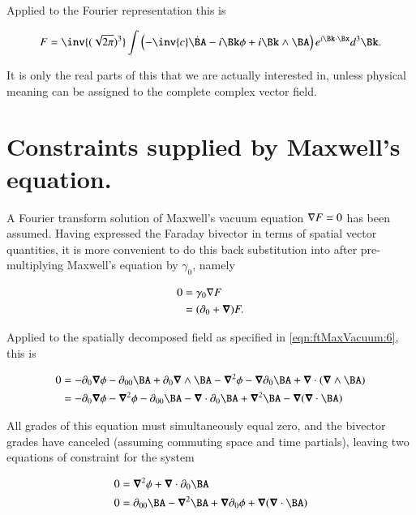 Applied to the Fourier representation this is

\begin{align}
\label{eqn:ftMaxVacuum:7}
F =
\inv{(\sqrt{2 \pi})^3} \int
\left(
- \inv{c} \dot{\BA}
- i \Bk \phi
+ i \Bk \wedge \BA
\right)
e^{i \Bk \cdot \Bx } d^3 \Bk.
\end{align}

It is only the real parts of this that we are actually interested in, unless physical meaning can be assigned to the complete complex vector field.

\section{Constraints supplied by Maxwell's equation.}

A Fourier transform solution of Maxwell's vacuum equation $\nabla F = 0$ has been assumed.  Having expressed the Faraday bivector in terms of spatial vector quantities, it is more convenient to do this back substitution into after pre-multiplying Maxwell's equation by $\gamma_0$, namely

\begin{align}
\label{eqn:ftMaxVacuum:20}
0
&= \gamma_0 \nabla F \\
&= (\partial_0 + \boldsymbol{\nabla}) F.
\end{align}

Applied to the spatially decomposed field as specified in \autoref{eqn:ftMaxVacuum:6}, this is

\begin{align*}
0
&=
-\partial_0 \spacegrad \phi
-\partial_{00} \BA
+ \partial_0 \spacegrad \wedge \BA
-\spacegrad^2 \phi
- \spacegrad \partial_0 \BA
+ \spacegrad \cdot (\spacegrad \wedge \BA ) \\
&=
- \partial_0 \spacegrad \phi - \spacegrad^2 \phi
- \partial_{00} \BA
- \spacegrad \cdot \partial_0 \BA
+ \spacegrad^2 \BA 
- \spacegrad (\spacegrad \cdot \BA ) \\
\end{align*}

All grades of this equation must simultaneously equal zero, and the bivector grades have canceled (assuming commuting space and time partials), leaving two equations of constraint for the system

\begin{subequations}
\label{eqn:ftMaxVacuum:22}
\begin{align}
0 &=
\spacegrad^2 \phi + \spacegrad \cdot \partial_0 \BA
\label{eqn:ftMaxVacuum:22a}
\\
0 &=
\partial_{00} \BA - \spacegrad^2 \BA
+ \spacegrad \partial_0 \phi 
+ \spacegrad ( \spacegrad \cdot \BA )
\label{eqn:ftMaxVacuum:22b}
\end{align}
\end{subequations}


